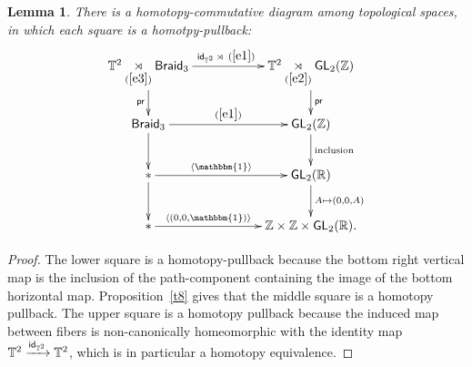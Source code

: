 \documentclass{amsart}
\newtheorem{lemma}[theorem]{Lemma}
\theoremstyle{definition}
\theoremstyle{remark}
\DeclareMathOperator{\pr}{\mathsf{pr}}
\newcommand{\lag}{\langle}
\newcommand{\rag}{\rangle}
\newcommand{\xra}{\xrightarrow}
\DeclareMathOperator{\uno}{\mathbbm{1}}
\DeclareMathOperator{\Braid}{\sf Braid}
\DeclareMathOperator{\GL}{\sf GL}
\DeclareMathOperator{\id}{\sf id}
\begin{document}
\begin{lemma}\label{t7}
There is a homotopy-commutative diagram among topological spaces, in which each square is a homotpy-pullback:
\begin{equation}\label{e23}
\xymatrix{
\TT^2 
\underset{(\ref{e3})}\rtimes
\Braid_3
\ar[rr]^-{\id_{\TT^2}\rtimes ~(\ref{e1})~} \ar[d]_-{\pr}
&&
\TT^2 \underset{(\ref{e2})}\rtimes \GL_2(\ZZ) \ar[d]^-{\pr}
\\
\Braid_3 \ar[d] \ar[rr]^-{~(\ref{e1})~}
&&
\GL_2(\ZZ) \ar[d]^-{\rm inclusion}
\\
\ast \ar[rr]^-{\lag \uno \rag } \ar[d]
&&
\GL_2(\RR) \ar[d]^-{A\mapsto (0,0,A)}
\\
\ast \ar[rr]^-{\lag (0,0,\uno)\rag }
&&
\ZZ\times \ZZ \times \GL_2(\RR)
.
}
\end{equation}
\end{lemma}



\begin{proof}
The lower square is a homotopy-pullback because the bottom right vertical map is the inclusion of the path-component containing the image of the bottom horizontal map.
Proposition~\ref{t8} gives that the middle square is a homotopy pullback.
The upper square is a homotopy pullback because the induced map between fibers is non-canonically homeomorphic with the identity map $\TT^2 \xra{\id_{\TT^2}}\TT^2$, which is in particular a homotopy equivalence.  
\end{proof}
\end{document}
